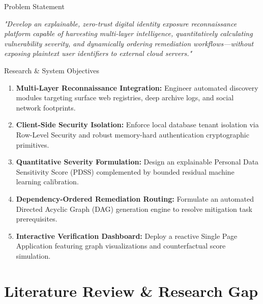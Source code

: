 \documentclass[aspectratio=169,10pt]{beamer}
\begin{document}
\begin{frame}{Problem Statement}
  \vspace{0.8cm}
  \Large
  \begin{center}
    \textit{"Develop an explainable, zero-trust digital identity exposure reconnaissance platform capable of harvesting multi-layer intelligence, quantitatively calculating vulnerability severity, and dynamically ordering remediation workflows—without exposing plaintext user identifiers to external cloud servers."}
  \end{center}
\end{frame}

\begin{frame}{Research \& System Objectives}
  \normalsize
  \vspace{0.1cm}
  \begin{enumerate}\setlength{\itemsep}{0.35cm}
    \item \textbf{Multi-Layer Reconnaissance Integration:} Engineer automated discovery modules targeting surface web registries, deep archive logs, and social network footprints.
    \item \textbf{Client-Side Security Isolation:} Enforce local database tenant isolation via Row-Level Security and robust memory-hard authentication cryptographic primitives.
    \item \textbf{Quantitative Severity Formulation:} Design an explainable Personal Data Sensitivity Score (PDSS) complemented by bounded residual machine learning calibration.
    \item \textbf{Dependency-Ordered Remediation Routing:} Formulate an automated Directed Acyclic Graph (DAG) generation engine to resolve mitigation task prerequisites.
    \item \textbf{Interactive Verification Dashboard:} Deploy a reactive Single Page Application featuring graph visualizations and counterfactual score simulation.
  \end{enumerate}
\end{frame}

\section{Literature Review \& Research Gap}
\end{document}

